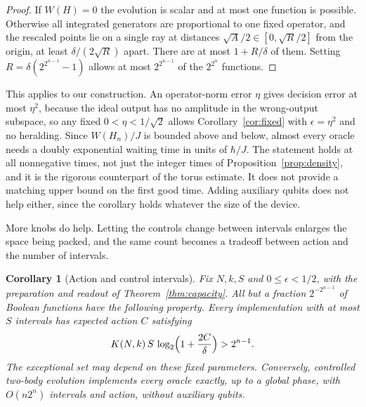 \documentclass[11pt,a4paper]{article}
\newtheorem{corollary}[theorem]{Corollary}
\begin{document}
\begin{proof}
If $W(H)=0$ the evolution is scalar and at most one function is possible. Otherwise all integrated generators are proportional to one fixed operator, and the rescaled points lie on a single ray at distances $\sqrt A/2\in[0,\sqrt R/2]$ from the origin, at least $\delta/(2\sqrt R)$ apart. There are at most $1+R/\delta$ of them. Setting $R=\delta(2^{2^{n-1}}-1)$ allows at most $2^{2^{n-1}}$ of the $2^{2^n}$ functions.
\end{proof}

This applies to our construction. An operator-norm error $\eta$ gives decision error at most $\eta^2$, because the ideal output has no amplitude in the wrong-output subspace, so any fixed $0<\eta<1/\sqrt2$ allows Corollary~\ref{cor:fixed} with $\epsilon=\eta^2$ and no heralding. Since $W(H_n)/J$ is bounded above and below, almost every oracle needs a doubly exponential waiting time in units of $\hbar/J$. The statement holds at all nonnegative times, not just the integer times of Proposition~\ref{prop:density}, and it is the rigorous counterpart of the torus estimate. It does not provide a matching upper bound on the first good time. Adding auxiliary qubits does not help either, since the corollary holds whatever the size of the device.

More knobs do help. Letting the controls change between intervals enlarges the space being packed, and the same count becomes a tradeoff between action and the number of intervals.

\begin{corollary}[Action and control intervals]
\label{cor:exchange}
Fix $N,k,S$ and $0\le\epsilon<1/2$, with the preparation and readout of Theorem~\ref{thm:capacity}. All but a fraction $2^{-2^{n-1}}$ of Boolean functions have the following property. Every implementation with at most $S$ intervals has expected action $C$ satisfying
\begin{equation}
 K(N,k)\,S\,\log_2\Bigl(1+\frac{2C}{\delta}\Bigr)>2^{n-1}.
 \label{eq:exchange}
\end{equation}
The exceptional set may depend on these fixed parameters. Conversely, controlled two-body evolution implements every oracle exactly, up to a global phase, with $O(n2^n)$ intervals and action, without auxiliary qubits.
\end{corollary}
\end{document}
